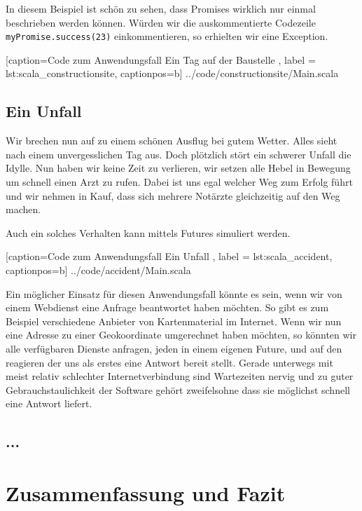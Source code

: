 \documentclass[11pt,a4paper,titlepage,ngerman]{scrartcl}
\begin{document}
In diesem Beispiel ist schön zu sehen, dass Promises wirklich nur einmal
beschrieben werden können. Würden wir die auskommentierte Codezeile
\texttt{myPromise.success(23)} einkommentieren, so erhielten wir eine
Exception.


    [caption={Code zum Anwendungsfall \glqq Ein Tag auf der Baustelle\grqq{} },
       label = lst:scala_constructionsite,
       captionpos=b]
 {../code/constructionsite/Main.scala}

\subsection{Ein Unfall}

Wir brechen nun auf zu einem schönen Ausflug bei gutem Wetter. Alles sieht
nach einem unvergesslichen Tag aus. Doch plötzlich stört ein schwerer Unfall
die Idylle. Nun haben wir keine Zeit zu verlieren, wir setzen alle Hebel in
Bewegung um schnell einen Arzt zu rufen. Dabei ist uns egal welcher
Weg zum Erfolg führt und wir nehmen in Kauf, dass sich mehrere Notärzte gleichzeitig
auf den Weg machen.

Auch ein solches Verhalten kann mittels Futures simuliert werden.


    [caption={Code zum Anwendungsfall \glqq Ein Unfall\grqq{} },
       label = lst:scala_accident,
       captionpos=b]
 {../code/accident/Main.scala}
 
Ein möglicher Einsatz für diesen Anwendungsfall könnte es sein, wenn wir von
einem Webdienst eine Anfrage beantwortet haben möchten. So gibt es zum Beispiel
verschiedene Anbieter von Kartenmaterial im Internet. Wenn wir nun eine Adresse
zu einer Geokoordinate umgerechnet haben möchten, so könnten wir alle verfügbaren
Dienste anfragen, jeden in einem eigenen Future, und auf den reagieren der uns
als erstes eine Antwort bereit stellt. Gerade unterwegs mit meist relativ schlechter
Internetverbindung sind Wartezeiten nervig und zu guter Gebrauchstaulichkeit der
Software gehört zweifelsohne dass sie möglichst schnell eine Antwort liefert.

\subsection{...}

\newpage
\section{Zusammenfassung und Fazit}
\end{document}
